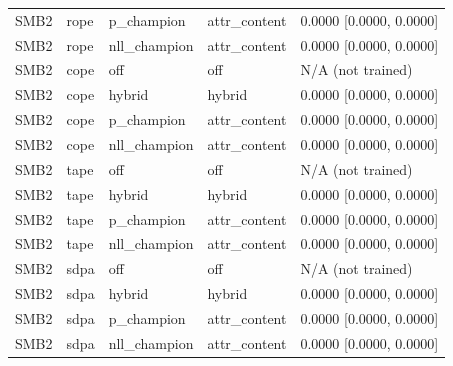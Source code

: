 \begin{tabular}{lllll}
SMB2 & rope & p\_champion & attr\_content & 0.0000 [0.0000, 0.0000] \\
SMB2 & rope & nll\_champion & attr\_content & 0.0000 [0.0000, 0.0000] \\
SMB2 & cope & off & off & N/A (not trained) \\
SMB2 & cope & hybrid & hybrid & 0.0000 [0.0000, 0.0000] \\
SMB2 & cope & p\_champion & attr\_content & 0.0000 [0.0000, 0.0000] \\
SMB2 & cope & nll\_champion & attr\_content & 0.0000 [0.0000, 0.0000] \\
SMB2 & tape & off & off & N/A (not trained) \\
SMB2 & tape & hybrid & hybrid & 0.0000 [0.0000, 0.0000] \\
SMB2 & tape & p\_champion & attr\_content & 0.0000 [0.0000, 0.0000] \\
SMB2 & tape & nll\_champion & attr\_content & 0.0000 [0.0000, 0.0000] \\
SMB2 & sdpa & off & off & N/A (not trained) \\
SMB2 & sdpa & hybrid & hybrid & 0.0000 [0.0000, 0.0000] \\
SMB2 & sdpa & p\_champion & attr\_content & 0.0000 [0.0000, 0.0000] \\
SMB2 & sdpa & nll\_champion & attr\_content & 0.0000 [0.0000, 0.0000] \\
\hline
\end{tabular}
